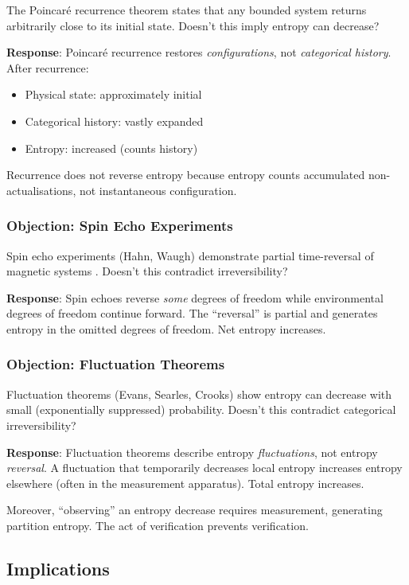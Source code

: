 \documentclass[twocolumn,10pt]{article}
\theoremstyle{definition}
\theoremstyle{remark}
\begin{document}
The Poincaré recurrence theorem states that any bounded system returns arbitrarily close to its initial state. Doesn't this imply entropy can decrease?

\textbf{Response}: Poincaré recurrence restores \textit{configurations}, not \textit{categorical history}. After recurrence:
\begin{itemize}
\item Physical state: approximately initial
\item Categorical history: vastly expanded
\item Entropy: increased (counts history)
\end{itemize}

Recurrence does not reverse entropy because entropy counts accumulated non-actualisations, not instantaneous configuration.

\subsubsection{Objection: Spin Echo Experiments}

Spin echo experiments (Hahn, Waugh) demonstrate partial time-reversal of magnetic systems \citep{waugh1972}. Doesn't this contradict irreversibility?

\textbf{Response}: Spin echoes reverse \textit{some} degrees of freedom while environmental degrees of freedom continue forward. The ``reversal'' is partial and generates entropy in the omitted degrees of freedom. Net entropy increases.

\subsubsection{Objection: Fluctuation Theorems}

Fluctuation theorems (Evans, Searles, Crooks) \citep{evans2002} show entropy can decrease with small (exponentially suppressed) probability. Doesn't this contradict categorical irreversibility?

\textbf{Response}: Fluctuation theorems describe entropy \textit{fluctuations}, not entropy \textit{reversal}. A fluctuation that temporarily decreases local entropy increases entropy elsewhere (often in the measurement apparatus). Total entropy increases.

Moreover, ``observing'' an entropy decrease requires measurement, generating partition entropy. The act of verification prevents verification.

\subsection{Implications}
\end{document}
